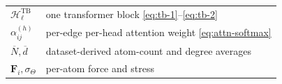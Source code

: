 \documentclass[11pt,a4paper]{article}
\newcommand{\bmF}{\bm{F}}
\newcommand{\Hb}{\mathcal{H}}
\theoremstyle{plain}
\theoremstyle{definition}
\theoremstyle{remark}
\begin{document}
\begin{tabular}{ll}
    $\Hb^{\mathrm{TB}}_\ell$                                                   & one transformer block \eqref{eq:tb-1}--\eqref{eq:tb-2}                                 \\
    $\alpha^{(h)}_{ij}$                                                        & per-edge per-head attention weight \eqref{eq:attn-softmax}                             \\
    $\overline N,\overline d$                                                  & dataset-derived atom-count and degree averages                                         \\
    $\bmF_i,\sigma_\Theta$                                                     & per-atom force and stress                                                              \\
\end{tabular}
\end{document}

